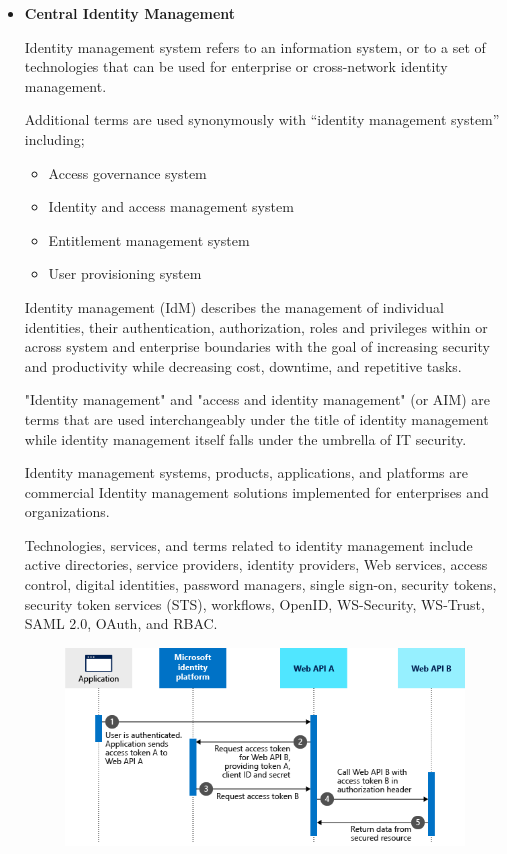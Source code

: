 \begin{itemize}
\item \textbf{Central Identity Management}\par
Identity management system refers to an information system, or to a set of technologies that can be used for enterprise or cross-network identity management.
\par
Additional terms are used synonymously with “identity management system” including;
\begin{itemize}
\item Access governance system
\item Identity and access management system
\item Entitlement management system
\item User provisioning system
\end{itemize}
Identity management (IdM) describes the management of individual identities, their authentication, authorization, roles and privileges within or across system and enterprise boundaries with the goal of increasing security and productivity while decreasing cost, downtime, and repetitive tasks.
\par
"Identity management" and "access and identity management" (or AIM) are terms that are used interchangeably under the title of identity management while identity management itself falls under the umbrella of IT security.
\par
Identity management systems, products, applications, and platforms are commercial Identity management solutions implemented for enterprises and organizations.
\par
Technologies, services, and terms related to identity management include active directories, service providers, identity providers, Web services, access control, digital identities, password managers, single sign-on, security tokens, security token services (STS), workflows, OpenID, WS-Security, WS-Trust, SAML 2.0, OAuth, and RBAC.
\begin{figure}[ht]
\centering
\includegraphics[width=35em]{figures/figure5.png}

\end{figure}
\end{itemize}
